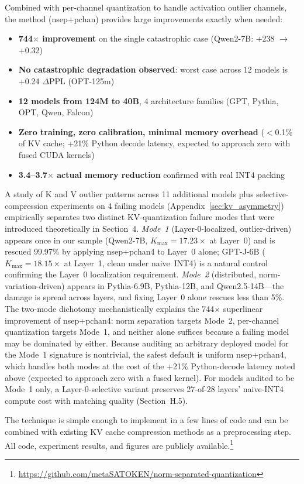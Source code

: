 \documentclass[11pt]{article}
\begin{document}
Combined with per-channel quantization to handle activation outlier channels, the method (nsep+pchan) provides large improvements exactly when needed:
\begin{itemize}[nosep]
  \item \textbf{744$\times$ improvement} on the single catastrophic case (Qwen2-7B: +238 $\to$ +0.32)
  \item \textbf{No catastrophic degradation observed}: worst case across 12 models is +0.24 $\Delta$PPL (OPT-125m)
  \item \textbf{12 models from 124M to 40B}, 4 architecture families (GPT, Pythia, OPT, Qwen, Falcon)
  \item \textbf{Zero training, zero calibration, minimal memory overhead} ($<$0.1\% of KV cache; +21\% Python decode latency, expected to approach zero with fused CUDA kernels)
  \item \textbf{3.4--3.7$\times$ actual memory reduction} confirmed with real INT4 packing
\end{itemize}

A study of K and V outlier patterns across 11 additional models plus selective-compression experiments on 4 failing models (Appendix~\ref{sec:kv_asymmetry}) empirically separates two distinct KV-quantization failure modes that were introduced theoretically in Section~4. \emph{Mode~1} (Layer-0-localized, outlier-driven) appears once in our sample (Qwen2-7B, $K_{\max}=17.23\times$ at Layer~0) and is rescued 99.97\% by applying nsep+pchan4 to Layer~0 alone; GPT-J-6B ($K_{\max}=18.15\times$ at Layer~1, clean under naive~INT4) is a natural control confirming the Layer~0 localization requirement. \emph{Mode~2} (distributed, norm-variation-driven) appears in Pythia-6.9B, Pythia-12B, and Qwen2.5-14B---the damage is spread across layers, and fixing Layer~0 alone rescues less than 5\%. The two-mode dichotomy mechanistically explains the 744$\times$ superlinear improvement of nsep+pchan4: norm separation targets Mode~2, per-channel quantization targets Mode~1, and neither alone suffices because a failing model may be dominated by either. Because auditing an arbitrary deployed model for the Mode~1 signature is nontrivial, the safest default is uniform nsep+pchan4, which handles both modes at the cost of the +21\% Python-decode latency noted above (expected to approach zero with a fused kernel). For models audited to be Mode~1 only, a Layer-0-selective variant preserves 27-of-28 layers' naive-INT4 compute cost with matching quality (Section~H.5).

The technique is simple enough to implement in a few lines of code and can be combined with existing KV cache compression methods as a preprocessing step. All code, experiment results, and figures are publicly available.\footnote{\url{https://github.com/metaSATOKEN/norm-separated-quantization}}
\end{document}
